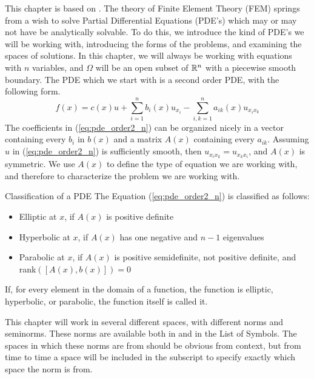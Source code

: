 This chapter is based on \cite{Braess}.
The theory of Finite Element Theory (FEM) springs from a 
wish to solve Partial Differential Equations (PDE's) 
which may or may not have be analytically solvable. 
To do this, we introduce the kind of PDE's we will 
be working with, introducing the forms of the 
problems, and examining the spaces of solutions. 
In this chapter, we will always be working with 
equations with $n$ variables, and $\Omega$ will be 
an open subset of $\mathbb{R}^n$ with a piecewise smooth boundary.
The PDE which we start with is a second order PDE, 
with the following form.
\begin{equation}
	f(x) = c(x) u + \sum_{i=1}^{n}b_i(x)u_{x_{i}}
	- \sum_{i,k=1}^{n}a_{ik}(x)u_{x_i x_k}\label{eq:pde_order2_n}
\end{equation}
The coefficients in (\ref*{eq:pde_order2_n}) can be 
organized nicely in a vector containing every $b_i$ 
in $b(x)$
and a matrix $A(x)$ containing every $a_{ik}$.
Assuming $u$ in (\ref*{eq:pde_order2_n}) is sufficiently 
smooth, then $u_{x_i x_k} =u_{x_k x_i} $, and $A(x)$ is 
symmetric. 
We use $A(x)$ to define the type of equation we are working 
with, and therefore to characterize the problem we are 
working with.
\begin{defn}{Classification of a PDE}
	The Equation (\ref{eq:pde_order2_n}) is classified as follows:
	\begin{itemize}
		\item Elliptic at $x$, if $A(x)$ is positive definite
		\item Hyperbolic at $x$, if $A(x)$ has one negative and $n-1$ eigenvalues
		\item Parabolic at $x$, if $A(x)$ is positive semidefinite, not positive definite, and rank$([A(x), b(x)])=0$
	\end{itemize}
	If, for every element in the domain of a function, the function is elliptic, hyperbolic, or parabolic, the function itself is called it.
\end{defn}
This chapter will work in several different spaces, with different norms and 
seminorms. 
These norms are available both in \cite{Braess} and in the List of Symbols. 
The spaces in which these norms are from should be obvious from context, but from 
time to time a space will be included in the subscript to specify exactly which 
space the norm is from.